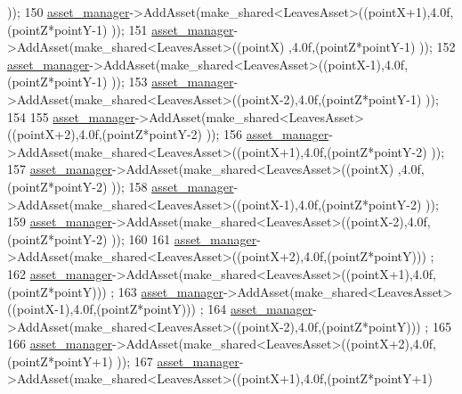 \begin{DoxyCode}
      ));
150             \hyperlink{classGameWorld_aec5c0bca4fb5a41e4aac2dce2871266d}{asset\_manager}->AddAsset(make\_shared<LeavesAsset>((pointX+1),4.0f,(pointZ*pointY-1)
      ));
151             \hyperlink{classGameWorld_aec5c0bca4fb5a41e4aac2dce2871266d}{asset\_manager}->AddAsset(make\_shared<LeavesAsset>((pointX)  ,4.0f,(pointZ*pointY-1)
      ));
152             \hyperlink{classGameWorld_aec5c0bca4fb5a41e4aac2dce2871266d}{asset\_manager}->AddAsset(make\_shared<LeavesAsset>((pointX-1),4.0f,(pointZ*pointY-1)
      ));
153             \hyperlink{classGameWorld_aec5c0bca4fb5a41e4aac2dce2871266d}{asset\_manager}->AddAsset(make\_shared<LeavesAsset>((pointX-2),4.0f,(pointZ*pointY-1)
      ));
154  
155             \hyperlink{classGameWorld_aec5c0bca4fb5a41e4aac2dce2871266d}{asset\_manager}->AddAsset(make\_shared<LeavesAsset>((pointX+2),4.0f,(pointZ*pointY-2)
      ));
156             \hyperlink{classGameWorld_aec5c0bca4fb5a41e4aac2dce2871266d}{asset\_manager}->AddAsset(make\_shared<LeavesAsset>((pointX+1),4.0f,(pointZ*pointY-2)
      ));
157             \hyperlink{classGameWorld_aec5c0bca4fb5a41e4aac2dce2871266d}{asset\_manager}->AddAsset(make\_shared<LeavesAsset>((pointX)  ,4.0f,(pointZ*pointY-2)
      ));
158             \hyperlink{classGameWorld_aec5c0bca4fb5a41e4aac2dce2871266d}{asset\_manager}->AddAsset(make\_shared<LeavesAsset>((pointX-1),4.0f,(pointZ*pointY-2)
      ));
159             \hyperlink{classGameWorld_aec5c0bca4fb5a41e4aac2dce2871266d}{asset\_manager}->AddAsset(make\_shared<LeavesAsset>((pointX-2),4.0f,(pointZ*pointY-2)
      ));
160  
161             \hyperlink{classGameWorld_aec5c0bca4fb5a41e4aac2dce2871266d}{asset\_manager}->AddAsset(make\_shared<LeavesAsset>((pointX+2),4.0f,(pointZ*pointY)))
      ;
162             \hyperlink{classGameWorld_aec5c0bca4fb5a41e4aac2dce2871266d}{asset\_manager}->AddAsset(make\_shared<LeavesAsset>((pointX+1),4.0f,(pointZ*pointY)))
      ;
163             \hyperlink{classGameWorld_aec5c0bca4fb5a41e4aac2dce2871266d}{asset\_manager}->AddAsset(make\_shared<LeavesAsset>((pointX-1),4.0f,(pointZ*pointY)))
      ;
164             \hyperlink{classGameWorld_aec5c0bca4fb5a41e4aac2dce2871266d}{asset\_manager}->AddAsset(make\_shared<LeavesAsset>((pointX-2),4.0f,(pointZ*pointY)))
      ;
165  
166             \hyperlink{classGameWorld_aec5c0bca4fb5a41e4aac2dce2871266d}{asset\_manager}->AddAsset(make\_shared<LeavesAsset>((pointX+2),4.0f,(pointZ*pointY+1)
      ));
167             \hyperlink{classGameWorld_aec5c0bca4fb5a41e4aac2dce2871266d}{asset\_manager}->AddAsset(make\_shared<LeavesAsset>((pointX+1),4.0f,(pointZ*pointY+1)

\end{DoxyCode}
